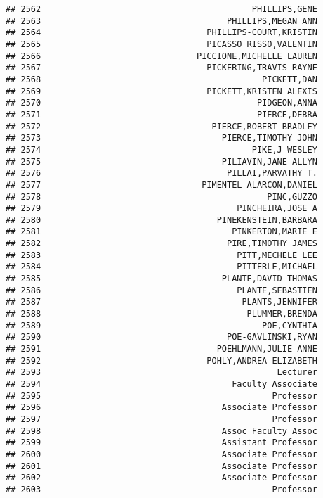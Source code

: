 \documentclass[
]{article}
\begin{document}
\begin{verbatim}
## 2562                                          PHILLIPS,GENE
## 2563                                     PHILLIPS,MEGAN ANN
## 2564                                 PHILLIPS-COURT,KRISTIN
## 2565                                 PICASSO RISSO,VALENTIN
## 2566                               PICCIONE,MICHELLE LAUREN
## 2567                                 PICKERING,TRAVIS RAYNE
## 2568                                            PICKETT,DAN
## 2569                                 PICKETT,KRISTEN ALEXIS
## 2570                                           PIDGEON,ANNA
## 2571                                           PIERCE,DEBRA
## 2572                                  PIERCE,ROBERT BRADLEY
## 2573                                    PIERCE,TIMOTHY JOHN
## 2574                                          PIKE,J WESLEY
## 2575                                    PILIAVIN,JANE ALLYN
## 2576                                     PILLAI,PARVATHY T.
## 2577                                PIMENTEL ALARCON,DANIEL
## 2578                                             PINC,GUZZO
## 2579                                       PINCHEIRA,JOSE A
## 2580                                   PINEKENSTEIN,BARBARA
## 2581                                      PINKERTON,MARIE E
## 2582                                     PIRE,TIMOTHY JAMES
## 2583                                       PITT,MECHELE LEE
## 2584                                       PITTERLE,MICHAEL
## 2585                                    PLANTE,DAVID THOMAS
## 2586                                       PLANTE,SEBASTIEN
## 2587                                        PLANTS,JENNIFER
## 2588                                         PLUMMER,BRENDA
## 2589                                            POE,CYNTHIA
## 2590                                     POE-GAVLINSKI,RYAN
## 2591                                   POEHLMANN,JULIE ANNE
## 2592                                 POHLY,ANDREA ELIZABETH
## 2593                                               Lecturer
## 2594                                      Faculty Associate
## 2595                                              Professor
## 2596                                    Associate Professor
## 2597                                              Professor
## 2598                                    Assoc Faculty Assoc
## 2599                                    Assistant Professor
## 2600                                    Associate Professor
## 2601                                    Associate Professor
## 2602                                    Associate Professor
## 2603                                              Professor

\end{verbatim}
\end{document}
